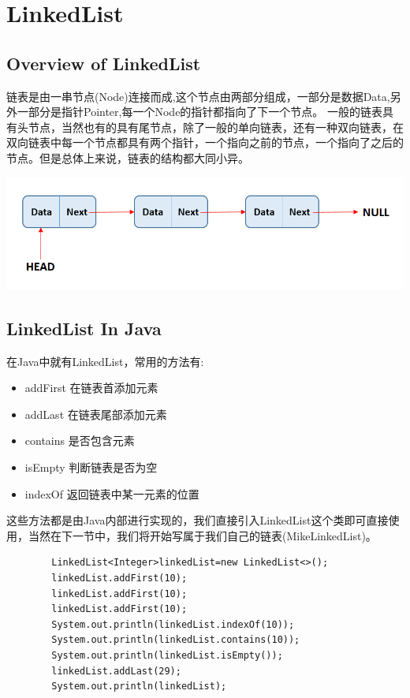 \documentclass[
	11pt,
	fleqn,
	a4paper,
]{LegrandOrangeBook}
\begin{document}
\chapter{LinkedList}
\section{Overview of LinkedList}
链表是由一串节点(Node)连接而成,这个节点由两部分组成，一部分是数据Data,另外一部分是指针Pointer,每一个Node的指针都指向了下一个节点。
一般的链表具有头节点，当然也有的具有尾节点，除了一般的单向链表，还有一种双向链表，在双向链表中每一个节点都具有两个指针，一个指向之前的节点，一个指向了之后的节点。但是总体上来说，链表的结构都大同小异。

\begin{center}
    \includegraphics[scale=0.8]{Images/linked-list.jpg}
\end{center}
\section{LinkedList In Java}
在Java中就有LinkedList，常用的方法有:
\begin{itemize}
    \item addFirst 在链表首添加元素
    \item addLast 在链表尾部添加元素
    \item contains 是否包含元素
    \item isEmpty 判断链表是否为空
    \item indexOf 返回链表中某一元素的位置
\end{itemize}
这些方法都是由Java内部进行实现的，我们直接引入LinkedList这个类即可直接使用，当然在下一节中，我们将开始写属于我们自己的链表(MikeLinkedList)。

\begin{verbatim}
        LinkedList<Integer>linkedList=new LinkedList<>();
        linkedList.addFirst(10);
        linkedList.addFirst(10);
        linkedList.addFirst(10);
        System.out.println(linkedList.indexOf(10));
        System.out.println(linkedList.contains(10));
        System.out.println(linkedList.isEmpty());
        linkedList.addLast(29);
        System.out.println(linkedList);
\end{verbatim}
\end{document}
